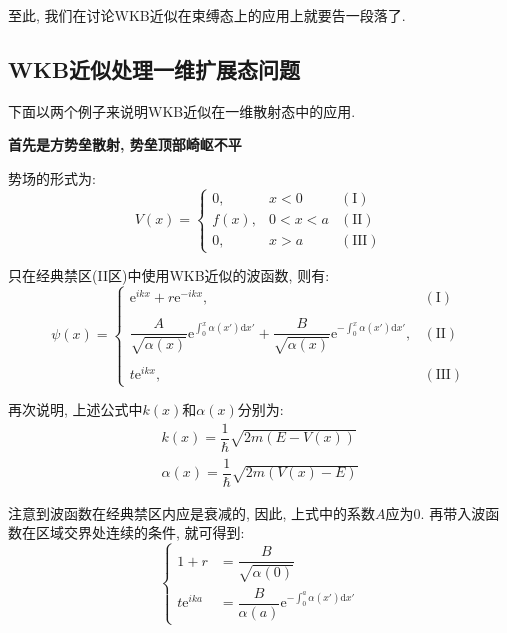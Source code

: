 \documentclass[a4paper, 11pt]{article}
\begin{document}
\begin{spacing}{1.2}
        至此, 我们在讨论WKB近似在束缚态上的应用上就要告一段落了.

      \subsection{WKB近似处理一维扩展态问题}

        下面以两个例子来说明WKB近似在一维散射态中的应用.
        
        \textbf{首先是方势垒散射, 势垒顶部崎岖不平}

        势场的形式为:
        \begin{equation}
          V(x) = \left\{\begin{array}{rlr}
            0, & x<0 & (\mathrm{I})\\
            f(x), & 0<x<a & (\mathrm{II})\\
            0, & x>a & (\mathrm{III})
          \end{array}\right.    
        \end{equation}

        只在经典禁区(II区)中使用WKB近似的波函数, 则有:
        \begin{equation}
          \psi(x) = \left\{\begin{array}{lr}
            \mathrm{e}^{ikx}+r\mathrm{e}^{-ikx}, & (\mathrm{I})\\
            \\
            \dfrac{A}{\sqrt{\alpha(x)}}\mathrm{e}^{\int_0^x\alpha(x')\mathrm{d}x'} + %
            \dfrac{B}{\sqrt{\alpha(x)}}\mathrm{e}^{-\int_0^x\alpha(x')\mathrm{d}x'} ,  & (\mathrm{II})\\
            \\
            t\mathrm{e}^{ikx}, & (\mathrm{III})
          \end{array}\right.
        \end{equation}
  
        再次说明, 上述公式中$k(x)$和$\alpha(x)$分别为:
        \begin{equation}
          \begin{aligned}
            k(x) = \dfrac{1}{\hbar}\sqrt{2m(E-V(x))}\\
            \alpha(x) = \dfrac{1}{\hbar}\sqrt{2m(V(x)-E)}
          \end{aligned}
        \end{equation}

        注意到波函数在经典禁区内应是衰减的, 因此, 上式中的系数$A$应为$0$. 再带入波函数在区域交界处连续的条件, 就可得到:   
        \begin{equation}
          \left\{
          \begin{aligned}
            1+r &= \dfrac{B}{\sqrt{\alpha(0)}}\\
            t\mathrm{e}^{ika} &= \dfrac{B}{\alpha(a)}\mathrm{e}^{-\int_0^a\alpha(x')\mathrm{d}x'}
          \end{aligned}\right.
        \end{equation}


\end{spacing}
\end{document}
